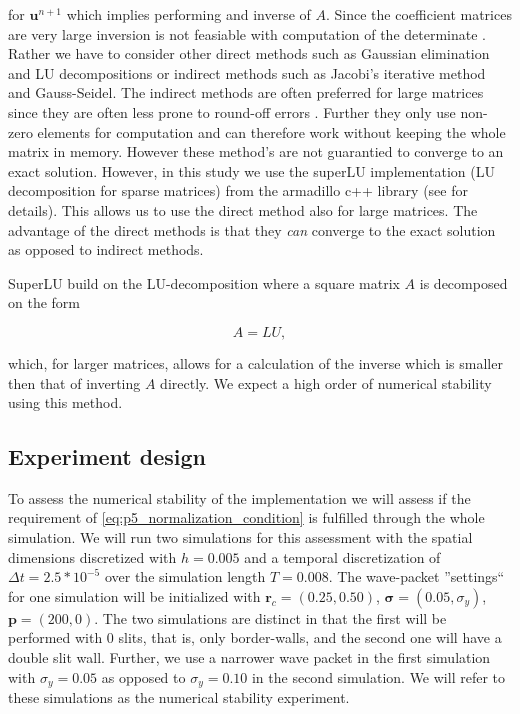 \documentclass[../main_proj5.tex]{subfiles}
\begin{document}
\noindent for $\mathbf{u}^{n+1}$ which implies performing and inverse of $A$. Since the coefficient matrices are very large inversion is not feasiable with computation of the determinate \cite{Linear_Algebra_and_its_Applications}. Rather we have to consider other direct methods such as Gaussian elimination and LU decompositions or indirect methods such as Jacobi's iterative method and Gauss-Seidel. The indirect methods are often preferred for large matrices since they are often less prone to round-off errors \cite{lecture_notes}. Further they only use non-zero elements for computation and can therefore work without keeping the whole matrix in memory. However these method's are not guarantied to converge to an exact solution. However, in this study we use the superLU implementation (LU decomposition for sparse matrices) from the armadillo c++ library (see \cite{liOverviewSuperLUAlgorithms2005} for details). This allows us to use the direct method also for large matrices. The advantage of the direct methods is that they \textit{can} converge to the exact solution as opposed to indirect methods. 

SuperLU build on the LU-decomposition where a square matrix $A$ is decomposed on the form 

\begin{equation}
    \label{eq:LU}
    A = LU, 
\end{equation}

\noindent which, for larger matrices, allows for a calculation of the inverse which is smaller then that of inverting $A$ directly. We expect a high order of numerical stability using this method.



\subsection{Experiment design} \label{sec:experimental_design}

To assess the numerical stability of the implementation we will assess if the requirement of \eqref{eq:p5_normalization_condition} is fulfilled through the whole simulation. We will run two simulations for this assessment with the spatial dimensions discretized with $h=0.005$ and a temporal discretization of $\Delta t = 2.5 * 10^{-5}$ over the simulation length $T=0.008$. The wave-packet ''settings`` for one simulation will be initialized with  $\mathbf{r}_c = (0.25, 0.50)$, $\mathbf{\sigma}=(0.05, \sigma_y)$, $\mathbf{p}=(200, 0)$. The two simulations are distinct in that the first will be performed with 0 slits, that is, only border-walls, and the second one will have a double slit wall. Further, we use a narrower wave packet in the first simulation with $\sigma_{y}=0.05$ as opposed to $\sigma_y=0.10$ in the second simulation. We will refer to these simulations as the numerical stability experiment.
\end{document}
